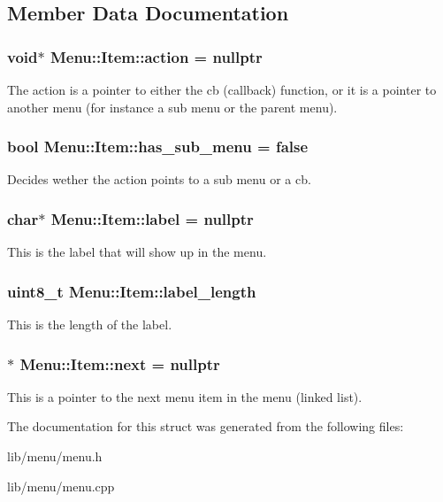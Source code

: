 \subsection{Member Data Documentation}
\hypertarget{struct_menu_1_1_item_a247e140fed2addf80986ba5a3506b9dd}{
\subsubsection[{action}]{\setlength{\rightskip}{0pt plus 5cm}void$\ast$ Menu\-::\-Item\-::action = nullptr}}\label{struct_menu_1_1_item_a247e140fed2addf80986ba5a3506b9dd}
The action is a pointer to either the cb (callback) function, or it is a pointer to another menu (for instance a sub menu or the parent menu). \hypertarget{struct_menu_1_1_item_a5c9895a137458b9a12dafd447ac7430b}{
\subsubsection[{has\-\_\-sub\-\_\-menu}]{\setlength{\rightskip}{0pt plus 5cm}bool Menu\-::\-Item\-::has\-\_\-sub\-\_\-menu = false}}\label{struct_menu_1_1_item_a5c9895a137458b9a12dafd447ac7430b}
Decides wether the action points to a sub menu or a cb. \hypertarget{struct_menu_1_1_item_a378723382fc64c752a85ffe6fec9707e}{
\subsubsection[{label}]{\setlength{\rightskip}{0pt plus 5cm}char$\ast$ Menu\-::\-Item\-::label = nullptr}}\label{struct_menu_1_1_item_a378723382fc64c752a85ffe6fec9707e}
This is the label that will show up in the menu. \hypertarget{struct_menu_1_1_item_a46749d046bbbde8d5308848d5394c2dc}{
\subsubsection[{label\-\_\-length}]{\setlength{\rightskip}{0pt plus 5cm}uint8\-\_\-t Menu\-::\-Item\-::label\-\_\-length}}\label{struct_menu_1_1_item_a46749d046bbbde8d5308848d5394c2dc}
This is the length of the label. \hypertarget{struct_menu_1_1_item_aadcc1e4e824296c6b72ac7d053f06869}{
\subsubsection[{next}]{$\ast$ Menu\-::\-Item\-::next = nullptr}}\label{struct_menu_1_1_item_aadcc1e4e824296c6b72ac7d053f06869}
This is a pointer to the next menu item in the menu (linked list). 

The documentation for this struct was generated from the following files\-:\begin{DoxyCompactItemize}
\item 
lib/menu/menu.\-h\item 
lib/menu/menu.\-cpp\end{DoxyCompactItemize}
